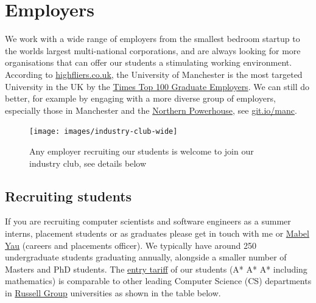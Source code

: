 \documentclass[
  12pt,
]{book}
\begin{document}
\hypertarget{employers}{%
\chapter{Employers}\label{employers}}

We work with a wide range of employers from the smallest bedroom startup to the worlds largest multi-national corporations, and are always looking for more organisations that can offer our students a stimulating working environment. According to \href{https://www.highfliers.co.uk}{highfliers.co.uk}, the University of Manchester is the most targeted University in the UK by the \href{https://www.top100graduateemployers.com}{Times Top 100 Graduate Employers}. \citep{times100, highfliers2021, highfliers2020, Birchall2019} We can still do better, for example by engaging with a more diverse group of employers, especially those in Manchester and the \href{https://northernpowerhouse.gov.uk/}{Northern Powerhouse}, see \href{https://git.io/manc}{git.io/manc}. \citep{gitmanc, londonvstherest, hebdenbridge, manhattanchester, manchattan}

\begin{figure}

{\centering \texttt{[image: images/industry-club-wide]} 

}

\caption{Any employer recruiting our students is welcome to join our industry club, see details below}\label{fig:unnamed-chunk-3}
\end{figure}

\hypertarget{recruiting}{%
\section{Recruiting students}\label{recruiting}}

If you are recruiting computer scientists and software engineers as a summer interns, placement students or as graduates please get in touch with me or \href{https://uk.linkedin.com/in/mabel-yau}{Mabel Yau} (careers and placements officer). We typically have around 250 undergraduate students graduating annually, alongside a smaller number of Masters and PhD students. The \href{https://www.ucas.com/ucas/tariff-calculator}{entry tariff} of our students (A* A* A* including mathematics) is comparable to other leading Computer Science (CS) departments in \href{https://en.wikipedia.org/wiki/Russell_Group}{Russell Group} universities as shown in the table below.
\end{document}
